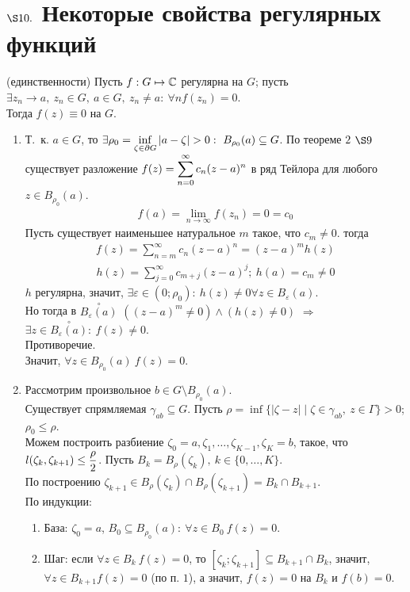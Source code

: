 \section{$\S 10.$ Некоторые свойства регулярных функций}
\theorem (единственности)
Пусть $f: G \mapsto \mathbb{C}$ регулярна на $G$; пусть $\exists z_n \to a, \ z_n \in
G, \ a \in G, \ z_n \neq a: \ \forall n f(z_n) = 0$.
\\
Тогда $f(z) \equiv 0$ на $G$.
\pr
\begin{enumerate}
    \item Т.~к. $a \in G$, то $\exists \rho_0 = \displaystyle \inf_{\zeta \in \partial
      G}\left| a-\zeta \right| > 0: \ B_{\rho_0}(a) \subseteq G $. По теореме
    $2$ $\S 9$ существует разложение $f(z) = \displaystyle \sum_{n=0}^{\infty}c_n(z-a)^n$
    в ряд Тейлора для любого $z \in B_{\rho_0}(a)$.
    \begin{align*}
      f(a) = \lim_{n \to \infty} f(z_n) = 0 = c_0
    \end{align*}
    Пусть существует наименьшее натуральное $m$ такое, что $c_m \neq 0$. тогда
    \begin{align*}
      f(z) = \sum_{n=m}^{\infty}c_n(z-a)^n = (z-a)^mh(z)
    \end{align*}
    \begin{align*}
      h(z) = \sum_{j=0}^{\infty}c_{m+j}(z-a)^j; \ h(a) = c_m \neq 0
    \end{align*}
    $h$ регулярна, значит, $\exists \varepsilon \in (0; \rho_0): \ h(z) \neq 0
    \forall z \in B_{\varepsilon}(a)$.
    \\
    Но тогда в $\overset{\circ}{B_{\varepsilon}(a)}$ $((z-a)^m \neq 0) \wedge
    (h(z) \neq 0)$ $\Rightarrow$ $\exists z \in
    \overset{\circ}{B_{\varepsilon}(a)}: \ f(z) \neq 0$.
    \\
    Противоречие.
    \\
    Значит, $\forall z \in B_{\rho_0}(a) \ f(z) = 0$.
    \item Рассмотрим произвольное $b \in G \setminus B_{\rho_0}(a)$.
    \\
    Существует спрямляемая $\gamma_{ab} \subseteq G$. Пусть $\rho = \inf\{\left|
        \zeta - z \right| \mid \zeta \in \gamma_{ab}, \ z \in \Gamma\} > 0$;
    $\rho_0 \leq \rho$.
    \\
    Можем построить разбиение $\zeta_0 = a, \zeta_1, \dots, \zeta_{K-1}, \zeta_K
    = b$, такое, что $l(\zeta_k, \zeta_{k+1}) \leq \displaystyle \frac{\rho}{2}$. Пусть
    $B_k = B_{\rho}(\zeta_k), \ k \in \{0, \dots, K\}$.
    \\
    По построению $\zeta_{k+1}\in B_{\rho}(\zeta_k) \cap B_{\rho}(\zeta_{k+1}) =
    B_k \cap B_{k+1}$.
    \\
    По индукции:
    \begin{enumerate}
        \item База: $\zeta_0 = a$, $B_0 \subseteq B_{\rho_0}(a): \ \forall z \in
        B_0 \ f(z) = 0$.
        \item Шаг: если $\forall z \in B_k \ f(z) = 0$, то $[\zeta_k;
        \zeta_{k+1}]\subseteq B_{k+1}\cap B_{k}$, значит, $\forall z \in B_{k+1}
        f(z) = 0$ (по п. $1$), а значит, $f(z) = 0$ на $B_k$ и $f(b) = 0 $.
    \end{enumerate}
\end{enumerate}
